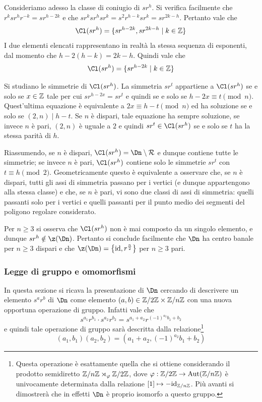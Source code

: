 \documentclass[11pt]{scrartcl}
\begin{document}
	Consideriamo adesso la classe di coniugio di $sr^h$. Si verifica facilmente
	che $r^k sr^h r^{-k} = s r^{h-2k}$ e che $sr^k sr^h sr^k = s^2 r^{h-k} sr^k =
	s r^{2k-h}$. Pertanto vale che
	\[ \Cl(sr^h) = \{ sr^{h-2k}, sr^{2k-h} \mid k \in \ZZ \} \]
	I due elementi elencati rappresentano in realtà la stessa sequenza di
	esponenti, dal momento che $h - 2(h-k) = 2k-h$. Quindi vale
	che
	\[ \Cl(sr^h) = \{ sr^{h-2k} \mid k \in \ZZ \} \]
	
	
	\begin{remark}
		Si studiano le simmetrie di $\Cl(sr^h)$. La simmetria $sr^t$ appartiene a
		$\Cl(sr^h)$ se e solo se $x \in \mathbb Z$ tale per cui $sr^{h-2x} = sr^t$
		e quindi se e solo se $h-2x \equiv t \pmod n$. Quest'ultima equazione
		è equivalente a $2x \equiv h-t \pmod n$ ed ha soluzione se e solo se
		$(2, n) \mid h-t$. Se $n$ è dispari, tale equazione ha sempre soluzione,
		se invece $n$ è pari, $(2, n)$ è uguale a $2$ e quindi $sr^t \in \Cl(sr^h)$
		se e solo se $t$ ha la stessa parità di $h$. \medskip
		
		Riassumendo, se $n$ è dispari, $\Cl(sr^h) = \Dn \setminus \mathcal{R}$ e
		dunque contiene tutte le simmetrie; se invece $n$ è pari, $\Cl(sr^h)$ contiene
		solo le simmetrie $sr^t$ con $t \equiv h \pmod 2$. Geometricamente questo
		è equivalente a osservare che, se $n$ è dispari, tutti gli assi di simmetria
		passano per i vertici (e dunque appartengono alla stessa classe) e che, se $n$
		è pari, vi sono due classi di assi di simmetria: quelli passanti solo per i vertici e
		quelli passanti per il punto medio dei segmenti del poligono regolare considerato.
	\end{remark}
	
	\begin{remark}
		Per $n \geq 3$ si osserva che $\Cl(sr^h)$ non è mai composto da un singolo elemento, e dunque
		$sr^h \notin \z(\Dn)$. Pertanto si conclude facilmente che $\Dn$ ha centro banale
		per $n \geq 3$ dispari e che $\z(\Dn) = \left\{ \id, r^{\frac{n}{2}} \right\}$ per $n \geq 3$
		pari.
	\end{remark}
	
	
	\subsubsection{Legge di gruppo e omomorfismi}
	
	In questa sezione si ricava la presentazione di $\Dn$ cercando di descrivere
	un elemento $s^a r^b$ di $\Dn$ come elemento $(a, b) \in \mathbb{Z}/{2}\mathbb{Z} \times \mathbb{Z}/{n}\mathbb{Z}$ con
	una nuova opportuna operazione di gruppo. Infatti vale che
	\[ s^{a_1} r^{b_1} \cdot s^{a_2} r^{b_2} = s^{a_1 + a_2} r^{(-1)^{a_2} b_1 + b_2} \]
	e quindi tale operazione di gruppo sarà descritta dalla relazione\footnote{
		Questa operazione è esattamente quella che si ottiene considerando il
		prodotto semidiretto
		$\mathbb{Z}/{n}\mathbb{Z} \rtimes_\varphi \mathbb{Z}/{2}\mathbb{Z}$, dove $\varphi : \mathbb{Z}/{2}\mathbb{Z} \to \operatorname{Aut}(\mathbb{Z}/{n}\mathbb{Z})$ è univocamente
		determinata dalla relazione $[1] \mapsto -\mathrm{id}_{\mathbb{Z}/{n}\mathbb{Z}}$. Più avanti si dimostrerà
		che in effetti $\Dn$ è proprio isomorfo a questo gruppo.
	}
	\[ (a_1, b_1) (a_2, b_2) = (a_1 + a_2, (-1)^{a_2} b_1 + b_2) \]
\end{document}
